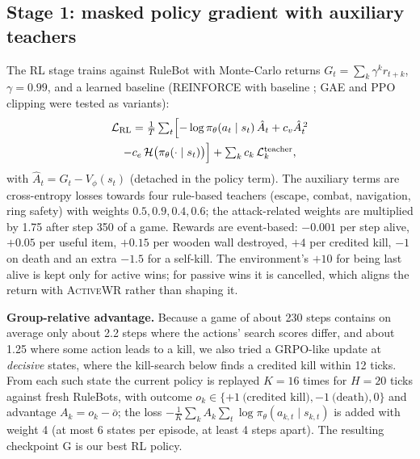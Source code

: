 \documentclass[11pt]{article}
\newcommand{\awr}{\textsc{ActiveWR}}
\begin{document}
\subsection{Stage 1: masked policy gradient with auxiliary teachers}
The RL stage trains against RuleBot with Monte-Carlo returns $G_t=\sum_{k}\gamma^k r_{t+k}$, $\gamma=0.99$, and a learned baseline (REINFORCE with baseline \cite{williams1992reinforce,sutton2018rl}; GAE \cite{schulman2016gae} and PPO clipping \cite{schulman2017ppo} were tested as variants):
\begin{multline}
\mathcal{L}_{\mathrm{RL}}=\tfrac{1}{T}\textstyle\sum_t\Bigl[-\log\pi_\theta(a_t\mid s_t)\,\hat A_t+c_v\hat A_t^{\,2}\\
-c_e\,\mathcal{H}\bigl(\pi_\theta(\cdot\mid s_t)\bigr)\Bigr]+\textstyle\sum_k c_k\,\mathcal{L}^{\mathrm{teacher}}_k,
\end{multline}
with $\hat A_t=G_t-V_\phi(s_t)$ (detached in the policy term). The auxiliary terms are cross-entropy losses towards four rule-based teachers (escape, combat, navigation, ring safety) with weights $0.5, 0.9, 0.4, 0.6$; the attack-related weights are multiplied by 1.75 after step 350 of a game. Rewards are event-based: $-0.001$ per step alive, $+0.05$ per useful item, $+0.15$ per wooden wall destroyed, $+4$ per credited kill, $-1$ on death and an extra $-1.5$ for a self-kill. The environment's $+10$ for being last alive is kept only for active wins; for passive wins it is cancelled, which aligns the return with \awr{} rather than shaping it.

\textbf{Group-relative advantage.} Because a game of about 230 steps contains on average only about 2.2 steps where the actions' search scores differ, and about 1.25 where some action leads to a kill, we also tried a GRPO-like update \cite{shao2024grpo} at \emph{decisive} states, where the kill-search below finds a credited kill within 12 ticks. From each such state the current policy is replayed $K=16$ times for $H=20$ ticks against fresh RuleBots, with outcome $o_k\in\{+1\ \text{(credited kill)},-1\ \text{(death)},0\}$ and advantage $A_k=o_k-\bar o$; the loss $-\frac1K\sum_k A_k\sum_{t}\log\pi_\theta(a_{k,t}\mid s_{k,t})$ is added with weight 4 (at most 6 states per episode, at least 4 steps apart). The resulting checkpoint G is our best RL policy.
\end{document}
